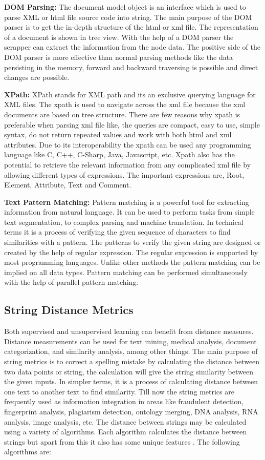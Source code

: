 \textbf{ DOM Parsing:} The document model object is an interface which is used to parse XML or html file source code into string. The main purpose of the DOM parser is to get the in-depth structure of the html or xml file. The representation of a document is shown in tree view. With the help of a DOM parser the scrapper can extract the information from the node data. The positive side of the DOM parser is more effective than normal parsing methods like the data persisting in the memory, forward and backward traversing is possible and direct changes are possible.

\textbf{ XPath:} XPath stands for XML path and its an exclusive querying language for XML files. The xpath is used to navigate across the xml file because the xml documents are based on tree structure. There are few reasons why xpath is preferable when parsing xml file like, the queries are compact, easy to use, simple syntax, do not return repeated values and work with both html and xml attributes. Due to its interoperability the xpath can be used any programming language like C, C++, C-Sharp, Java, Javascript, etc. Xpath also has the potential to retrieve the relevant information from any complicated xml file by allowing different types of expressions. The important expressions are, Root, Element, Attribute, Text and Comment.

\textbf{ Text Pattern Matching:} Pattern matching is a powerful tool for extracting information from natural language. It can be used to perform tasks from simple text segmentation, to complex parsing and machine translation. In technical terms it is a process of verifying the given sequence of characters to find similarities with a pattern. The patterns to verify the given string are designed or created by the help of regular expression. The regular expression is supported by most programming languages. Unlike other methods the pattern matching can be implied on all data types. Pattern matching can be performed simultaneously with the help of parallel pattern matching. 

\subsection{String Distance Metrics}
Both supervised and unsupervised learning can benefit from distance measures. Distance measurements can be used for text mining, medical analysis, document categorization, and similarity analysis, among other things. The main purpose of string metrics is to correct a spelling mistake by calculating the distance between two data points or string, the calculation will give the string similarity between the given inputs. In simpler terms, it is a process of calculating distance between one text to another text to find similarity. Till now the string metrics are frequently used as information integration in areas like fraudulent detection, fingerprint analysis, plagiarism detection, ontology merging, DNA analysis, RNA analysis, image analysis, etc. The distance between strings may be calculated using a variety of algorithms. Each algorithm calculates the distance between strings but apart from this it also has some unique features \cite{Wu2020}. The following algorithms are:

